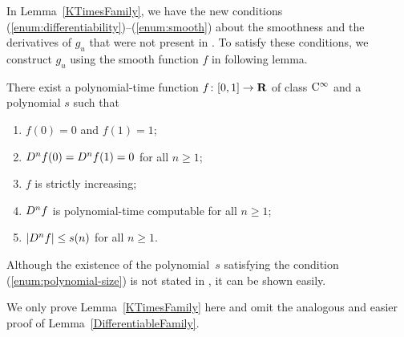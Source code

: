 In Lemma~\ref{KTimesFamily}, 
we have the new conditions (\ref{enum:differentiability})--(\ref{enum:smooth}) 
about the smoothness and the derivatives of $g_u$ 
that were not present in \cite[Lemma 4.1]{kawamura2010lipschitz}.
To satisfy these conditions, we construct $g_u$ 
using the smooth function $f$ in following lemma.

\begin{lemma}
 \label{SmoothFunction}
 There exist a polynomial-time function $f \colon [0, 1] \to \mathbf R$ of class $\mathrm C^\infty$ and a polynomial $s$ such that
  \begin{enumerate}
   \item $f(0) = 0$ and $f(1) = 1$;
   \item $D ^n f (0) = D ^n f (1) = 0$ for all $n \ge 1$;
   \item $f$ is strictly increasing;
   \item $D ^n f$ is polynomial-time computable for all $n \ge 1$;
   \item \label{enum:polynomial-size}
	 $|D^n f| \le s(n)$ for all $n \ge 1$. 
  \end{enumerate}
 \end{lemma}

Although the existence of the polynomial~$s$ satisfying the condition (\ref{enum:polynomial-size}) is not stated in \cite[Lemma 3.6]{ko1991complexity},
it can be shown easily.

We only prove Lemma~\ref{KTimesFamily} here
and omit the analogous and easier proof of Lemma~\ref{DifferentiableFamily}.

